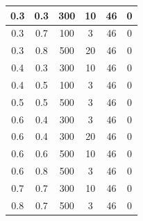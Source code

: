 \begin{center}
\begin{longtable}[c]{|c|c|c|c|c|c|}
        0.3 & 0.3 & 300 & 10 & 46 & 0 \\ \hline
        0.3 & 0.7 & 100 & 3 & 46 & 0 \\ \hline
        0.3 &  0.8 &  500 &   20 &    46 &     0 \\ \hline
        0.4 &  0.3 &  300 &   10 &    46 &     0 \\ \hline
        0.4 &  0.5 &  100 &    3 &    46 &     0 \\ \hline
        0.5 &  0.5 &  500 &    3 &    46 &     0 \\ \hline
        0.6 &  0.4 &  300 &    3 &    46 &     0 \\ \hline
        0.6 &  0.4 &  300 &   20 &    46 &     0 \\ \hline
        0.6 &  0.6 &  500 &   10 &    46 &     0 \\ \hline
        0.6 &  0.8 &  500 &    3 &    46 &     0 \\ \hline
        0.7 &  0.7 &  300 &   10 &    46 &     0 \\ \hline
        0.8 &  0.7 &  500 &    3 &    46 &     0 \\ \hline
\end{longtable}
\end{center}


